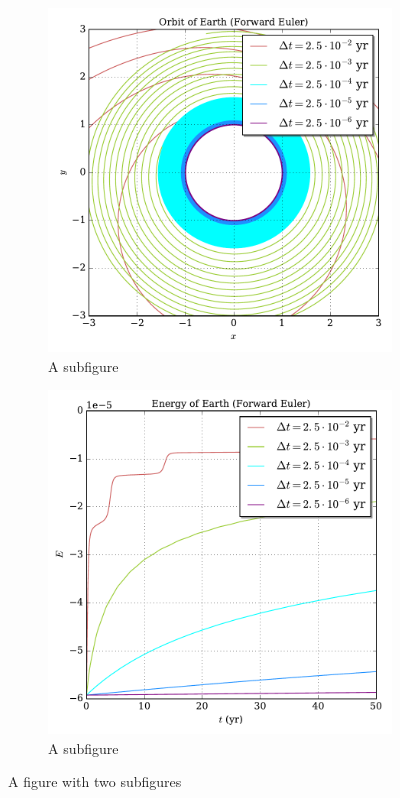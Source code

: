 \documentclass[prb,aps,twocolumn,showpacs,10pt]{revtex4-1}
\begin{document}
\begin{figure}
\centering
\begin{subfigure}{.5\textwidth}
  \centering
  \includegraphics[width=\linewidth]{binary_fixed_euler_orbit.pdf}
  \caption{A subfigure}
  \label{fig:sub1}
\end{subfigure}%
\begin{subfigure}{.5\textwidth}
  \centering
  \includegraphics[width=\linewidth]{binary_fixed_euler_energy.pdf}
  \caption{A subfigure}
  \label{fig:sub2}
\end{subfigure}
\caption{A figure with two subfigures}
\label{fig:test}
\end{figure}
\end{document}
